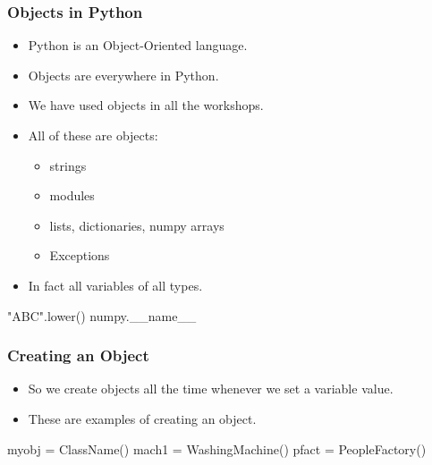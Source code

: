 \documentclass{beamer}
\begin{document}
\begin{frame}[fragile]
\frametitle{Objects in Python}
\begin{itemize}
\item Python is an Object-Oriented language.
\item Objects are everywhere in Python.
\item We have used objects in all the workshops.
\item All of these are objects:
\begin{itemize}
\item strings
\item modules
\item lists, dictionaries, numpy arrays
\item Exceptions
\end{itemize}
\item In fact all variables of all types.
\end{itemize}
\begin{code}
"ABC".lower()
numpy.__name__
\end{code}
\end{frame}

\begin{frame}[fragile]
\frametitle{Creating an Object}
\begin{itemize}
\item So we create objects all the time whenever we set a variable value.
\item These are examples of creating an object.
\end{itemize}

\begin{code}
myobj = ClassName()
mach1 = WashingMachine()
pfact = PeopleFactory()
\end{code}

\end{frame}
\end{document}
